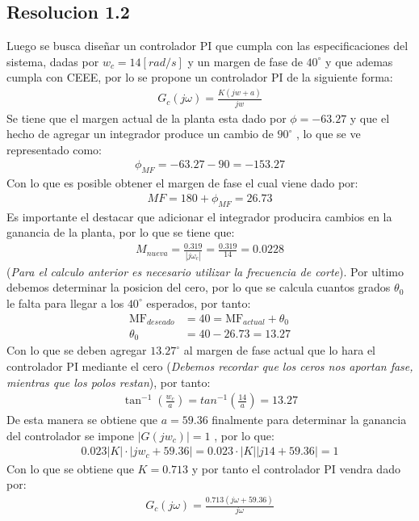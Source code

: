\documentclass[
  11pt,
  letterpaper,
   addpoints,
   answers
  ]{exam}
\begin{document}
\begin{questions}
\begin{solution}
    \subsection*{Resolucion 1.2}
    Luego se busca diseñar un controlador PI que cumpla con las especificaciones del sistema, dadas por $w_{c}= 14[rad/s]$ y un margen de fase de $40^{\circ}$ y que ademas cumpla con CEEE, por lo se propone un controlador PI de la siguiente forma:
    \begin{align}
        G_{c}(j\omega) = \frac{K(jw + a)}{jw}
    \end{align}
    Se tiene que el margen actual de la planta esta dado por $\phi = -63.27$ y que el hecho de agregar un integrador produce un cambio de $90^{\circ}$ , lo que se ve representado como:
    \begin{align}
        \phi_{MF} = -63.27 - 90 = -153.27
    \end{align}
    Con lo que es posible obtener el margen de fase el cual viene dado por:
    \begin{align}
        MF = 180 + \phi_{MF} = 26.73
    \end{align}
    Es importante el destacar que adicionar el integrador producira cambios en la ganancia de la planta, por lo que se tiene que:
    \begin{align}
        M_{nueva} = \frac{0.319}{|j\omega_{c}|} = \frac{0.319}{14}  = 0.0228
    \end{align}
    (\textit{Para el calculo anterior es necesario utilizar la frecuencia de corte}). Por ultimo debemos determinar la posicion del cero, por lo que se calcula cuantos grados $\theta_{0}$ le falta para llegar a los $40^{\circ}$ esperados, por tanto:
    \begin{align}
        \text{MF}_{deseado} &= 40 = \text{MF}_{actual} + \theta_{0}\\
        \theta_{0} &= 40 - 26.73 = 13.27
    \end{align}
    Con lo que se deben agregar $13.27^{\circ}$ al margen de fase actual que lo hara el controlador PI mediante el cero (\textit{Debemos recordar que los ceros nos aportan fase, mientras que los polos restan}), por tanto:
    \begin{align}
        \tan^{-1}\left(\frac{w_{c}}{a}\right) = tan^{-1}\left(\frac{14}{a}\right) = 13.27
    \end{align}
    De esta manera se obtiene que $a = 59.36$  finalmente para determinar la ganancia del controlador se impone $|G(jw_{c})|=1$ , por lo que:
    \begin{align}
        0.023 |K| \cdot |jw_{c} + 59.36| = 0.023 \cdot | K| | j14 + 59.36| = 1
    \end{align}
    Con lo que se obtiene que $K = 0.713$ y por tanto el controlador PI vendra dado por:
    \begin{align}
        G_{c}(j\omega) = \frac{0.713(j\omega + 59.36)}{j\omega}
    \end{align}

\end{solution}
\end{questions}
\end{document}
